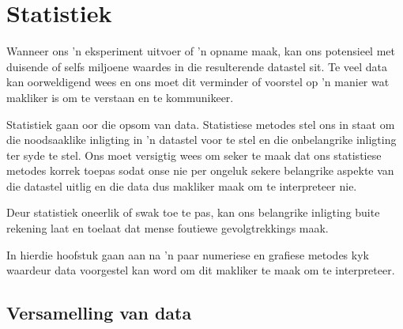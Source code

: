 \chapter{Statistiek}


Wanneer ons 'n eksperiment uitvoer of 'n opname maak, kan ons potensieel met duisende of selfs miljoene waardes in die resulterende datastel sit. Te veel data kan oorweldigend wees en ons moet dit verminder of voorstel op 'n manier wat makliker is om te verstaan en te kommunikeer.\par 

Statistiek gaan oor die opsom van data. Statistiese metodes stel ons in staat om die noodsaaklike inligting in 'n datastel voor te stel en die onbelangrike inligting ter syde te stel. Ons moet versigtig wees om seker te maak dat ons statistiese metodes korrek toepas sodat onse nie per ongeluk sekere belangrike aspekte van die datastel uitlig en die data dus makliker maak om te interpreteer nie. \par

Deur statistiek oneerlik of swak toe te pas, kan ons belangrike inligting buite rekening laat en toelaat dat mense foutiewe gevolgtrekkings maak. \par

In hierdie hoofstuk gaan aan na 'n paar numeriese en grafiese metodes kyk waardeur data voorgestel kan word om dit makliker te maak om te interpreteer.\par



\par
{}

\section{Versamelling van data}

